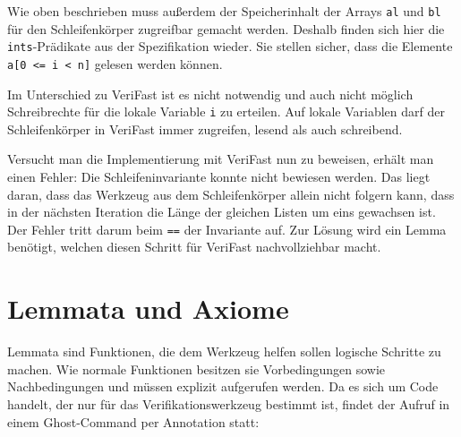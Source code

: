 Wie oben beschrieben muss außerdem der Speicherinhalt der Arrays \lstinline{al} und \lstinline{bl} für
den Schleifenkörper zugreifbar gemacht werden. Deshalb finden sich hier die \lstinline{ints}-Prädikate
aus der Spezifikation wieder. Sie stellen sicher, dass die Elemente \lstinline{a[0 <= i < n]} gelesen
werden können.

Im Unterschied zu VeriFast ist es nicht notwendig und auch nicht möglich Schreibrechte für die lokale Variable 
\lstinline{i} zu erteilen. Auf lokale Variablen darf der Schleifenkörper in VeriFast immer zugreifen, lesend
als auch schreibend.

Versucht man die Implementierung mit VeriFast nun zu beweisen, erhält man einen Fehler: Die Schleifeninvariante
konnte nicht bewiesen werden. 
Das liegt daran, dass das Werkzeug aus dem Schleifenkörper allein nicht folgern kann, dass in der nächsten Iteration 
die Länge der gleichen Listen um eins gewachsen ist. Der Fehler tritt darum beim \lstinline{==} der Invariante auf.
Zur Lösung wird ein Lemma benötigt, welchen diesen Schritt für VeriFast nachvollziehbar macht.



\section{Lemmata und Axiome}
\label{verifizierung:lemma}

Lemmata sind Funktionen, die dem Werkzeug helfen sollen logische Schritte zu machen. Wie normale
Funktionen besitzen sie Vorbedingungen sowie Nachbedingungen und müssen explizit aufgerufen werden.
Da es sich um Code handelt, der nur für das Verifikationswerkzeug bestimmt ist, findet der Aufruf
in einem Ghost-Command per Annotation statt:

